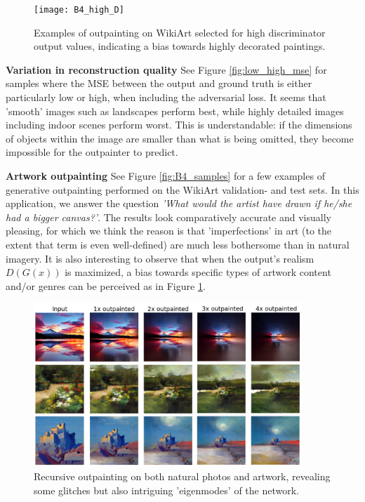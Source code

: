 \documentclass[twocolumn,showpacs,%
  nofootinbib,aps,superscriptaddress,%
  eqsecnum,prd,notitlepage,showkeys,10pt]{revtex4-1}
\begin{document}
\begin{figure}[tp]
\centering
  \begin{adjustbox}{center}
  \texttt{[image: B4\_high\_D]}
  \end{adjustbox}
  \caption{Examples of outpainting on WikiArt selected for high discriminator output values, indicating a bias towards highly decorated paintings.}
  \label{fig:B4_high_D}
\end{figure}

\textbf{Variation in reconstruction quality} \hspace{0.3cm}
See Figure \ref{fig:low_high_mse} for samples where the MSE between the output and ground truth is either particularly low or high, when including the adversarial loss. It seems that 'smooth' images such as landscapes perform best, while highly detailed images including indoor scenes perform worst. This is understandable: if the dimensions of objects within the image are smaller than what is being omitted, they become impossible for the outpainter to predict.

\textbf{Artwork outpainting} \hspace{0.3cm}
See Figure \ref{fig:B4_samples} for a few examples of generative outpainting performed on the WikiArt validation- and test sets. In this application, we answer the question \textit{'What would the artist have drawn if he/she had a bigger canvas?'}. The results look comparatively accurate and visually pleasing, for which we think the reason is that 'imperfections' in art (to the extent that term is even well-defined) are much less bothersome than in natural imagery. It is also interesting to observe that when the output's realism $D(G(x))$ is maximized, a bias towards specific types of artwork content and/or genres can be perceived as in Figure \ref{fig:B4_high_D}.

\begin{figure}[tp]
\centering
  \begin{adjustbox}{center}
  \includegraphics[width=0.9\textwidth]{B34_recursive}
  \end{adjustbox}
  \caption{Recursive outpainting on both natural photos and artwork, revealing some glitches but also intriguing 'eigenmodes' of the network.}
  \label{fig:B34_recursive}
\end{figure}
\end{document}
